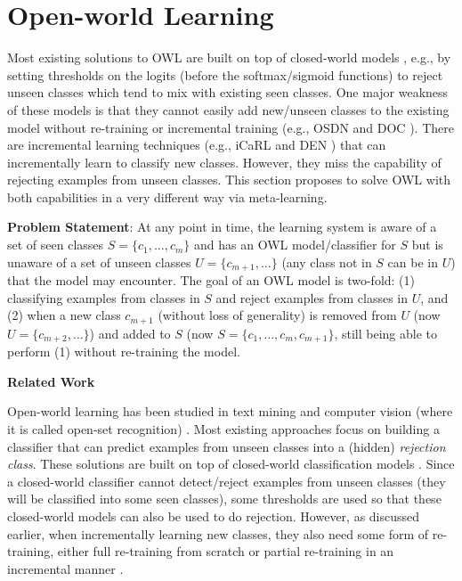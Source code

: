\section{Open-world Learning}
Most existing solutions to OWL are built on top of closed-world models \cite{bendale2015towards,bendale2016towards,fei2016learning,shu-xu-liu:2017:EMNLP2017}, e.g., by setting thresholds on the logits (before the softmax/sigmoid functions) to reject unseen classes which tend to mix with existing seen classes. One major weakness of these models is that they cannot easily add new/unseen classes to the existing model without re-training or incremental training (e.g., OSDN \cite{bendale2016towards} and DOC \cite{shu-xu-liu:2017:EMNLP2017}).
There are incremental learning techniques (e.g., iCaRL \cite{rebuffi2017icarl} and DEN \cite{lee2017lifelong}) that can incrementally learn to classify new classes. However, they miss the capability of rejecting examples from unseen classes.
This section proposes to solve OWL with both capabilities in a very different way via meta-learning.

\textbf{Problem Statement}: At any point in time, the learning system is aware of a set of seen classes $S=\{c_1, \dots, c_m\}$
and has an OWL model/classifier for $S$ but is unaware of a set of unseen classes $U=\{c_{m+1}, \dots\}$ (any class not in $S$ can be in $U$) that the model may encounter. The goal of an OWL model is two-fold: (1) classifying examples from classes in $S$ and reject examples from classes in $U$, and (2) when a new class $c_{m+1}$ (without loss of generality) is removed from $U$ (now $U=\{c_{m+2}, \dots\}$) and added to $S$ (now $S=\{c_1, \dots, c_m, c_{m+1}\}$, still being able to perform (1) without re-training the model.

\textbf{Related Work}
\label{chap2:sec:rel}

Open-world learning has been studied in text mining and computer vision (where it is called open-set recognition) \cite{bendale2015towards,chen2018lifelong,fei2016learning}. Most existing approaches focus on building a classifier that can predict examples from unseen classes into a (hidden) \textit{rejection class}.
These solutions are built on top of closed-world classification models \cite{bendale2015towards,bendale2016towards,shu-xu-liu:2017:EMNLP2017}. Since a closed-world classifier cannot detect/reject examples from unseen classes (they will be classified into some seen classes), some thresholds are used so that these closed-world models can also be used to do rejection. However, as discussed earlier, when incrementally learning new classes, they also need some form of re-training, either full re-training from scratch \cite{bendale2016towards,shu-xu-liu:2017:EMNLP2017} or partial re-training in an incremental manner \cite{bendale2015towards,fei2016learning}. 

